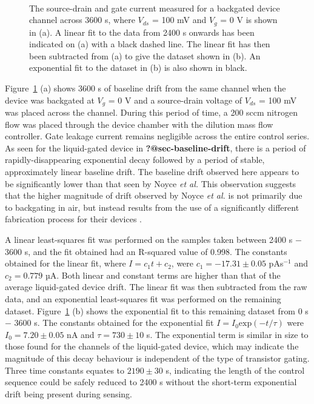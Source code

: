 \documentclass[
  a4paper,
]{scrbook}
\begin{document}
\begin{figure}
\begin{minipage}[t]{0.70\linewidth}
{{}

}

\end{minipage}%
%
\begin{minipage}[t]{0.15\linewidth}

{\centering 

~

}

\end{minipage}%

\caption{\label{fig-bg-baseline-drift}The source-drain and gate current
measured for a backgated device channel across 3600 s, where \(V_{ds}\)
= 100 mV and \(V_g\) = 0 V is shown in (a). A linear fit to the data
from 2400 s onwards has been indicated on (a) with a black dashed line.
The linear fit has then been subtracted from (a) to give the dataset
shown in (b). An exponential fit to the dataset in (b) is also shown in
black.}

\end{figure}

Figure~\ref{fig-bg-baseline-drift} (a) shows 3600 s of baseline drift
from the same channel when the device was backgated at \(V_g\) = 0 V and
a source-drain voltage of \(V_{ds}\) = 100 mV was placed across the
channel. During this period of time, a 200 sccm nitrogen flow was placed
through the device chamber with the dilution mass flow controller. Gate
leakage current remains negligible across the entire control series. As
seen for the liquid-gated device in \textbf{?@sec-baseline-drift}, there
is a period of rapidly-disappearing exponential decay followed by a
period of stable, approximately linear baseline drift. The baseline
drift observed here appears to be significantly lower than that seen by
Noyce \emph{et al.} This observation suggests that the higher magnitude
of drift observed by Noyce \emph{et al.} is not primarily due to
backgating in air, but instead results from the use of a significantly
different fabrication process for their devices \autocite{Noyce2019}.

A linear least-squares fit was performed on the samples taken between
2400 s \(-\) 3600 s, and the fit obtained had an R-squared value of
0.998. The constants obtained for the linear fit, where
\(I = c_1t + c_2\), were \(c_1 = -17.31\pm0.05\) pAs\(^{-1}\) and
\(c_2 = 0.779\) µA. Both linear and constant terms are higher than that
of the average liquid-gated device drift. The linear fit was then
subtracted from the raw data, and an exponential least-squares fit was
performed on the remaining dataset. Figure~\ref{fig-bg-baseline-drift}
(b) shows the exponential fit to this remaining dataset from 0 s \(-\)
3600 s. The constants obtained for the exponential fit
\(I = I_0\textrm{exp}(-t/\tau)\) were \(I_0 = 7.20 \pm 0.05\) nA and
\(\tau = 730 \pm 10\) s. The exponential term is similar in size to
those found for the channels of the liquid-gated device, which may
indicate the magnitude of this decay behaviour is independent of the
type of transistor gating. Three time constants equates to
\(2190 \pm 30\) s, indicating the length of the control sequence could
be safely reduced to 2400 s without the short-term exponential drift
being present during sensing.
\end{document}
